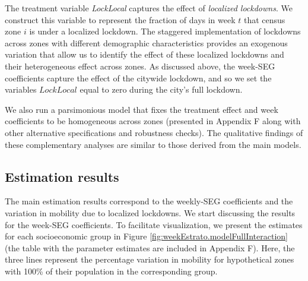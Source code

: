 The treatment variable \emph{LockLocal} captures the effect of {\em localized lockdowns}. We construct this variable to represent the fraction of days in week $t$ that census zone $i$ is under a localized lockdown. The staggered implementation of lockdowns across zones with different demographic characteristics provides an exogenous variation that allow us to identify the effect of these localized lockdowns and their heterogeneous effect across zones. As discussed above, the week-SEG coefficients  capture the effect of the citywide lockdown, and so we set  the variables $LockLocal$ equal to zero during the city's full lockdown. 

We also run a parsimonious model that fixes the treatment effect and week coefficients  to be homogeneous across zones (presented in Appendix F along with other alternative specifications and robustness checks). The qualitative findings of these complementary analyses are similar to those derived from the main models.

\subsection{Estimation results}

The main estimation results correspond to the weekly-SEG coefficients  and the variation in mobility due to localized lockdowns. We start discussing the results for the week-SEG coefficients. To facilitate visualization, we present the estimates for each socioeconomic group in Figure \ref{fig:weekEstrato.modelFullInteraction} (the table with the parameter estimates are included in Appendix F). Here, the three lines represent the percentage variation in mobility for hypothetical zones with 100\% of their population in the corresponding group. 

